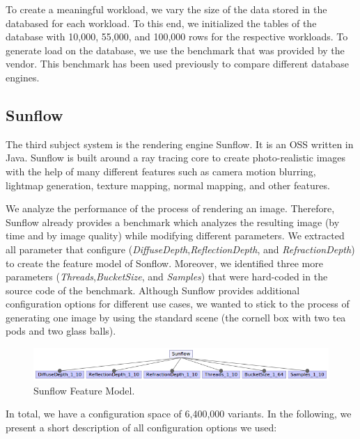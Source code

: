 To create a meaningful workload, we vary the size of the data stored in the databased for each workload. To this end, we initialized the tables of the database with 10,000, 55,000, and 100,000 rows for the respective workloads. To generate load on the database, we use the benchmark that was provided by the vendor. This benchmark has been used previously to compare different database engines.

\subsection{Sunflow}

The third subject system is the rendering engine Sunflow. It is an \ac{OSS} written in Java. Sunflow is built around a ray tracing core to create photo-realistic images with the help of many different features such as camera motion blurring, lightmap generation, texture mapping, normal mapping, and other features. 

We analyze the performance of the process of rendering an image. Therefore, Sunflow already provides a benchmark which analyzes the resulting image (by time and by image quality) while modifying different parameters. We extracted all parameter that configure (\textit{DiffuseDepth},\textit{ReflectionDepth}, and \textit{RefractionDepth}) to create the feature model of Sonflow. Moreover, we identified three more parameters (\textit{Threads},\textit{BucketSize}, and \textit{Samples}) that were hard-coded in the source code of the benchmark. Although Sunflow provides additional configuration options for different use cases, we wanted to stick to the process of generating one image by using the standard scene (the cornell box with two tea pods and two glass balls).

\begin{figure}
  \centering
  \includegraphics[width=\textwidth]{images/Sunflow_Feature_model}
  \caption{Sunflow Feature Model.}
  \label{fm_sunflow}
\end{figure}

In total, we have a configuration space of 6,400,000 variants. In the following, we present a short description of all configuration options we used:

